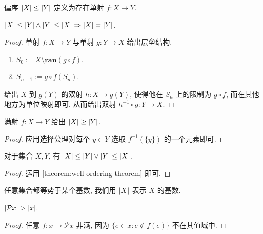 \begin{definition}
    偏序 \(\abs{X} \le \abs{Y}\) 定义为存在单射 \(f : X \to Y\).
\end{definition}

\begin{lemma}
    \(\abs{X} \le \abs{Y} \land \abs{Y} \le \abs{X} \Rightarrow \abs{X} = \abs{Y}\).

    \begin{proof}
        单射 \(f : X \to Y\) 与单射 \(g : Y \to X\) 给出层垒结构.

        \begin{enumerate}
            \item \(S_0 := X \setminus \mathbf{ran} (g \circ f)\).
            \item \(S_{n + 1} := g \circ f (S_n)\).
        \end{enumerate}

        给出 \(X\) 到 \(g(Y)\) 的双射 \(h : X \to g(Y)\),
        使得他在 \(S_n\) 上的限制为 \(g \circ f\), 而在其他地方为单位映射即可, 从而给出双射 \(h^{-1} \circ g : Y \to X\).
    \end{proof}
\end{lemma}

\begin{lemma}
    满射 \(f : X \to Y\) 给出 \(\abs{X} \ge \abs{Y}\).

    \begin{proof}
        应用选择公理对每个 \(y \in Y\) 选取 \(f^{-1} (\{y\})\) 的一个元素即可.
    \end{proof}
\end{lemma}

\begin{lemma}
    对于集合 \(X, Y\), 有 \(\abs{X} \le \abs{Y} \lor \abs{Y} \le \abs{X}\).

    \begin{proof}
        运用 \ref{theorem:well-ordering theorem} 即可.
    \end{proof}
\end{lemma}

\begin{corollary}
    任意集合都等势于某个基数, 我们用 \(\abs{X}\) 表示 \(X\) 的基数.
\end{corollary}

\begin{theorem}
    [Cantor] \label{theorem:Cantor's Px > x} \(\abs{\mathcal{P} x} > \abs{x}\).

    \begin{proof}
        任意 \(f : x \to \mathcal{P} x\) 非满, 因为 \(\{e \in x : e \notin f(e)\}\) 不在其值域中.
    \end{proof}
\end{theorem}

